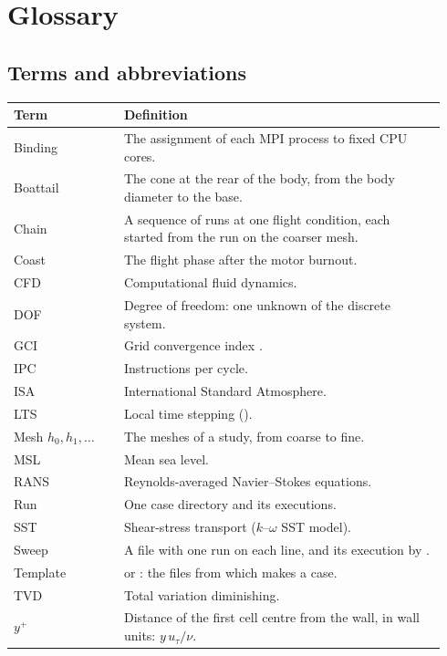 \chapter{Glossary}\label{app:glossary}

\section{Terms and abbreviations}

\begin{longtable}{@{}P{0.24\linewidth} P{0.70\linewidth}@{}}
\toprule
Term & Definition \\
\midrule
\endhead
Binding & The assignment of each MPI process to fixed CPU cores. \\
Boattail & The cone at the rear of the body, from the body diameter to the base. \\
Chain & A sequence of runs at one flight condition, each started from the run on the coarser mesh. \\
Coast & The flight phase after the motor burnout. \\
CFD & Computational fluid dynamics. \\
DOF & Degree of freedom: one unknown of the discrete system. \\
GCI & Grid convergence index \citep{celik2008}. \\
IPC & Instructions per cycle. \\
ISA & International Standard Atmosphere. \\
LTS & Local time stepping (). \\
Mesh $h_0, h_1, \ldots$ & The meshes of a study, from coarse to fine. \\
MSL & Mean sea level. \\
RANS & Reynolds-averaged Navier--Stokes equations. \\
Run & One case directory and its executions. \\
SST & Shear-stress transport ($k$--$\omega$ SST model). \\
Sweep & A file with one run on each line, and its execution by . \\
Template &  or : the files from which  makes a case. \\
TVD & Total variation diminishing. \\
$y^+$ & Distance of the first cell centre from the wall, in wall units: $y\,u_\tau/\nu$. \\
\bottomrule
\end{longtable}

